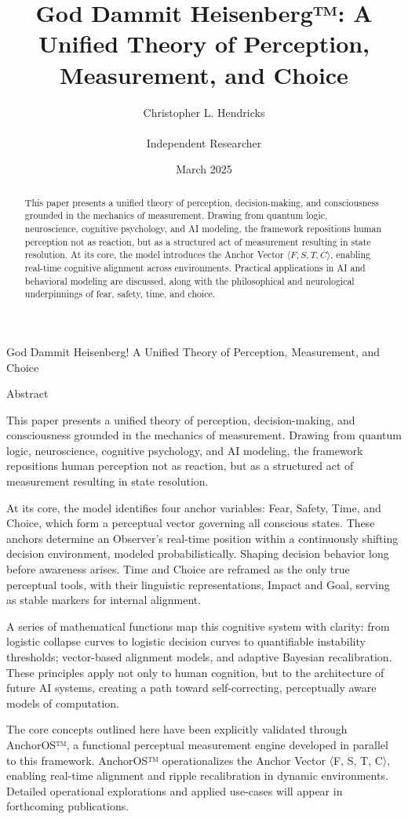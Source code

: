 \documentclass[11pt]{article}
\title{God Dammit Heisenberg™: A Unified Theory of Perception, Measurement, and Choice}
\author{Christopher L. Hendricks \\\\ Independent Researcher}
\date{March 2025}
\begin{document}
\maketitle

\begin{abstract}
This paper presents a unified theory of perception, decision-making, and consciousness grounded in the mechanics of measurement. Drawing from quantum logic, neuroscience, cognitive psychology, and AI modeling, the framework repositions human perception not as reaction, but as a structured act of measurement resulting in state resolution. At its core, the model introduces the Anchor Vector $\langle F, S, T, C \rangle$, enabling real-time cognitive alignment across environments. Practical applications in AI and behavioral modeling are discussed, along with the philosophical and neurological underpinnings of fear, safety, time, and choice.
\end{abstract}
God Dammit Heisenberg!
A Unified Theory of Perception, Measurement, and Choice

Abstract

This paper presents a unified theory of perception, decision-making, and consciousness grounded in the mechanics of measurement. Drawing from quantum logic, neuroscience, cognitive psychology, and AI modeling, the framework repositions human perception not as reaction, but as a structured act of measurement resulting in state resolution.

At its core, the model identifies four anchor variables: Fear, Safety, Time, and Choice, which form a perceptual vector governing all conscious states. These anchors determine an Observer’s real-time position within a continuously shifting decision environment, modeled probabilistically. Shaping decision behavior long before awareness arises. Time and Choice are reframed as the only true perceptual tools, with their linguistic representations, Impact and Goal, serving as stable markers for internal alignment.

A series of mathematical functions map this cognitive system with clarity: from logistic collapse curves to logistic decision curves to quantifiable instability thresholds; vector-based alignment models, and adaptive Bayesian recalibration. These principles apply not only to human cognition, but to the architecture of future AI systems, creating a path toward self-correcting, perceptually aware models of computation.

The core concepts outlined here have been explicitly validated through AnchorOS™, a functional perceptual measurement engine developed in parallel to this framework. AnchorOS™ operationalizes the Anchor Vector 〈F, S, T, C〉, enabling real-time alignment and ripple recalibration in dynamic environments. Detailed operational explorations and applied use-cases will appear in forthcoming publications.
\end{document}
